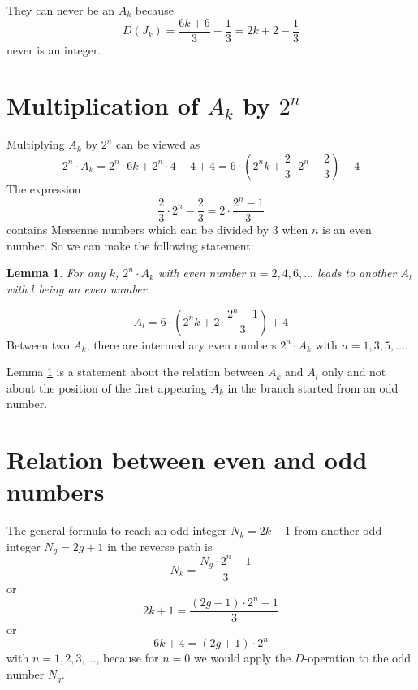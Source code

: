 \documentclass[10pt,a4paper]{article}
\newtheorem{lemma}{Lemma}
\begin{document}
They can never be an $A_k$ because
\begin{equation}
D(J_k)=\frac{6k+6}{3}-\frac{1}{3}=2k+2-\frac{1}{3}
\end{equation}
never is an integer.

\section{Multiplication of $A_k$ by $2^n$}
Multiplying $A_k$ by $2^n$ can be viewed as
\begin{equation}
2^n\cdot A_k=2^n\cdot6k+2^n\cdot4-4+4=6\cdot(2^n k+\frac{2}{3}\cdot2^n-\frac{2}{3})+4
\end{equation}
The expression
\begin{equation}
\frac{2}{3}\cdot2^n-\frac{2}{3}=2\cdot\frac{2^n-1}{3}
\end{equation}
contains Mersenne numbers which can be divided by 3 when $n$ is an even number. So we can make the following statement:

\begin{lemma}
For any $k$, $2^n\cdot A_k$ with even number $n=2,4,6,\ldots$ leads to another $A_l$ with $l$ being an even number.
\label{lemma:AkAl}
\end{lemma}
\begin{equation}
A_{l}=6\cdot(2^nk+2\cdot\frac{2^n-1}{3})+4
\end{equation}
Between two $A_k$, there are intermediary even numbers $2^n\cdot A_k$ with $n=1,3,5,\ldots$.

Lemma \ref{lemma:AkAl} is a statement about the relation between $A_k$ and $A_l$ only and not about the position of the first appearing $A_k$ in the branch started from an odd number.

\section{Relation between even and odd numbers}
The general formula to reach an odd integer $N_k=2k+1$ from another odd integer $N_g=2g+1$ in the reverse path is
\begin{equation}
	N_k=\frac{N_g\cdot2^n - 1}{3}
\label{eq:geneq}
\end{equation}
or
\begin{equation}
	2k+1=\frac{(2g+1)\cdot2^n - 1}{3}
\label{eq:geneqkg}
\end{equation}
or
\begin{equation}
	6k+4=(2g+1)\cdot2^n
\label{eq:Ak_vs_all}
\end{equation}
with $n=1,2,3,\ldots$, because for $n=0$ we would apply the $D$-operation to the odd number $N_g$.
\end{document}
